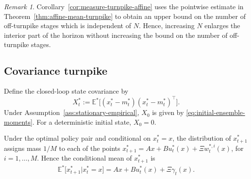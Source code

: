 \documentclass[10pt,journal,twoside]{IEEEtran}
\theoremstyle{definition}
\theoremstyle{remark}
\newtheorem{remark}{Remark}
\begin{document}
\begingroup
\begin{remark}
Corollary~\ref{cor:measure-turnpike-affine} uses the pointwise estimate in
Theorem~\ref{thm:affine-mean-turnpike} to obtain an upper bound on the number
of off-turnpike stages which is
independent of \(N\). Hence, increasing \(N\) enlarges the interior part of
the horizon without increasing the bound on the number of off-turnpike
stages.
\end{remark}
\endgroup









\subsection{Covariance turnpike}
\label{subsec:covariance-turnpike}

Define the closed-loop state covariance by
\begin{equation*}
    X_t^*:=\mathbb E^*\big[(x_t^*-m_t^*)(x_t^*-m_t^*)^\top\big].
\end{equation*}
Under
Assumption~\ref{ass:stationary-empirical}, \(X_0\) is given by
\eqref{eq:initial-ensemble-moments}. For a deterministic initial state, \(X_0=0\).

Under the optimal policy pair and conditional on
\(x_t^*=x\), the distribution of \(x_{t+1}^*\) assigns mass \(1/M\) to each of the points 
$x_{t+1}^*=Ax+B u_t^*(x)+\Xi w_t^{*,i}(x)$,
for \( i=1,\ldots,M\). Hence the conditional mean of $x_{t+1}^*$ is
\begin{equation}
	\begin{aligned}
		\mathbb E^*
		\big[
		x_{t+1}^*
		\big| x_t^*=x
		\big] =
		Ax+B u_t^*(x)
		+\Xi\gamma_t(x).
	\end{aligned}
	\label{eq:psi-def}
\end{equation}



\end{document}
